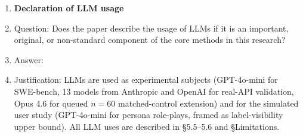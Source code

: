 \begin{enumerate}
\item {\bf Declaration of LLM usage}
    \item[] Question: Does the paper describe the usage of LLMs if it is an important, original, or non-standard component of the core methods in this research?
    \item[] Answer: \answerYes{}
    \item[] Justification: LLMs are used as experimental subjects (GPT-4o-mini for SWE-bench, 13 models from Anthropic and OpenAI for real-API validation, Opus 4.6 for queued $n{=}60$ matched-control extension) and for the simulated user study (GPT-4o-mini for persona role-plays, framed as label-visibility upper bound). All LLM uses are described in \S5.5--5.6 and \S Limitations.

\end{enumerate}
